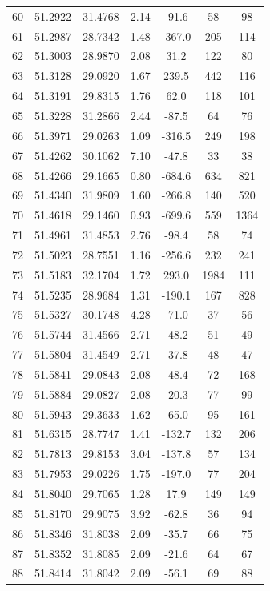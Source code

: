 \begin{longtable}{ccccccc}
60 & 51.2922 & 31.4768 & 2.14 & -91.6 & 58 & 98 \\
61 & 51.2987 & 28.7342 & 1.48 & -367.0 & 205 & 114 \\
62 & 51.3003 & 28.9870 & 2.08 & 31.2 & 122 & 80 \\
63 & 51.3128 & 29.0920 & 1.67 & 239.5 & 442 & 116 \\
64 & 51.3191 & 29.8315 & 1.76 & 62.0 & 118 & 101 \\
65 & 51.3228 & 31.2866 & 2.44 & -87.5 & 64 & 76 \\
66 & 51.3971 & 29.0263 & 1.09 & -316.5 & 249 & 198 \\
67 & 51.4262 & 30.1062 & 7.10 & -47.8 & 33 & 38 \\
68 & 51.4266 & 29.1665 & 0.80 & -684.6 & 634 & 821 \\
69 & 51.4340 & 31.9809 & 1.60 & -266.8 & 140 & 520 \\
70 & 51.4618 & 29.1460 & 0.93 & -699.6 & 559 & 1364 \\
71 & 51.4961 & 31.4853 & 2.76 & -98.4 & 58 & 74 \\
72 & 51.5023 & 28.7551 & 1.16 & -256.6 & 232 & 241 \\
73 & 51.5183 & 32.1704 & 1.72 & 293.0 & 1984 & 111 \\
74 & 51.5235 & 28.9684 & 1.31 & -190.1 & 167 & 828 \\
75 & 51.5327 & 30.1748 & 4.28 & -71.0 & 37 & 56 \\
76 & 51.5744 & 31.4566 & 2.71 & -48.2 & 51 & 49 \\
77 & 51.5804 & 31.4549 & 2.71 & -37.8 & 48 & 47 \\
78 & 51.5841 & 29.0843 & 2.08 & -48.4 & 72 & 168 \\
79 & 51.5884 & 29.0827 & 2.08 & -20.3 & 77 & 99 \\
80 & 51.5943 & 29.3633 & 1.62 & -65.0 & 95 & 161 \\
81 & 51.6315 & 28.7747 & 1.41 & -132.7 & 132 & 206 \\
82 & 51.7813 & 29.8153 & 3.04 & -137.8 & 57 & 134 \\
83 & 51.7953 & 29.0226 & 1.75 & -197.0 & 77 & 204 \\
84 & 51.8040 & 29.7065 & 1.28 & 17.9 & 149 & 149 \\
85 & 51.8170 & 29.9075 & 3.92 & -62.8 & 36 & 94 \\
86 & 51.8346 & 31.8038 & 2.09 & -35.7 & 66 & 75 \\
87 & 51.8352 & 31.8085 & 2.09 & -21.6 & 64 & 67 \\
88 & 51.8414 & 31.8042 & 2.09 & -56.1 & 69 & 88 \\

\end{longtable}
